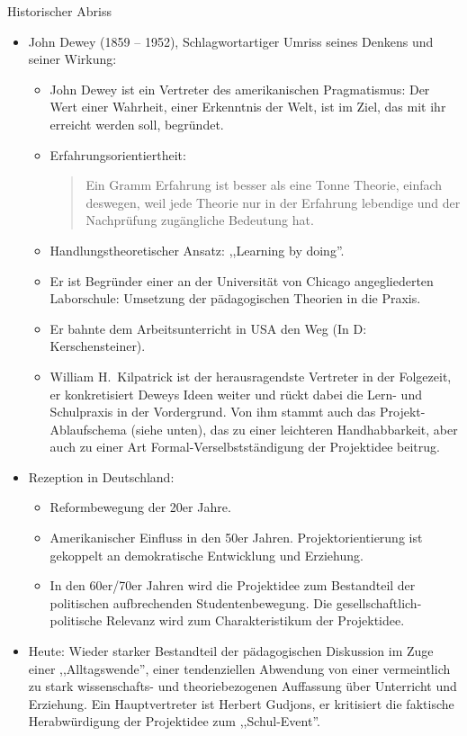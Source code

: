 Historischer Abriss
\begin{itemize}
\item John Dewey (1859 -- 1952),
Schlagwortartiger Umriss seines Denkens und seiner Wirkung:
\begin{itemize}
\item John Dewey ist ein Vertreter des amerikanischen Pragmatismus:
Der Wert einer Wahrheit, einer Erkenntnis der Welt, ist im Ziel, das mit ihr
erreicht werden soll, begr\"{u}ndet.

\item Erfahrungsorientiertheit:
\begin{quote}
Ein Gramm Erfahrung ist besser als eine Tonne Theorie, einfach deswegen, weil jede
Theorie nur in der Erfahrung lebendige und der Nachpr\"{u}fung zug\"{a}ngliche Bedeutung hat.
\end{quote}

\item Handlungstheoretischer Ansatz: ,,Learning by doing''.

\item Er ist Begr\"{u}nder einer an der Universit\"{a}t von Chicago angegliederten
Laborschule: Umsetzung der p\"{a}dagogischen Theorien in die Praxis.

\item Er bahnte dem Arbeitsunterricht in USA den Weg (In D: Kerschensteiner).

\item William H.\ Kilpatrick ist der herausragendste Vertreter in der Folgezeit,
er konkretisiert Deweys Ideen weiter und r\"{u}ckt dabei die Lern- und Schulpraxis in
der Vordergrund.
Von ihm stammt auch das Projekt-Ablaufschema (siehe unten), das zu einer
leichteren Handhabbarkeit, aber auch zu einer Art Formal-Verselbstst\"{a}ndigung
der Projektidee beitrug.

\end{itemize}

\item Rezeption in Deutschland:
\begin{itemize}
\item Reformbewegung der 20er Jahre.
\item Amerikanischer Einfluss in den 50er Jahren.
Projektorientierung ist gekoppelt an demokratische Entwicklung und Erziehung.
\item In den 60er/70er Jahren wird die Projektidee zum Bestandteil der
politischen aufbrechenden Studenten\-bewegung.
Die gesellschaftlich-politische Relevanz wird zum
Charakteristikum der Projektidee.
\end{itemize}

\item Heute: Wieder starker Bestandteil der p\"{a}dagogischen Diskussion im Zuge
einer ,,Alltagswende'', einer tendenziellen Abwendung von einer
vermeintlich zu stark wissenschafts- und theoriebezogenen Auffassung \"{u}ber Unterricht
und Erziehung. Ein Hauptvertreter ist Herbert Gudjons, er kritisiert die
faktische Herabw\"{u}rdigung der Projektidee zum ,,Schul-Event''.
\end{itemize}

